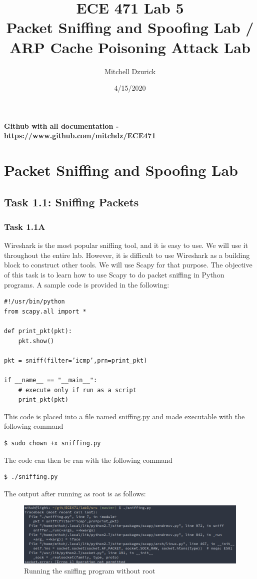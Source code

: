 \documentclass[12pt]{article}
\title {{\bf ECE 471 Lab 5} \\
\large{Packet Sniffing and Spoofing Lab / ARP Cache Poisoning Attack Lab
}}
\author{Mitchell Dzurick}
\date{4/15/2020}
\begin{document}
\maketitle
\textbf{Github with all documentation - \url{https://www.github.com/mitchdz/ECE471}}
\tableofcontents 
\clearpage



\section{Packet Sniffing and Spoofing Lab}

\subsection{Task 1.1: Sniffing Packets}
\subsubsection{Task 1.1A}
Wireshark is the most popular sniffing tool, and it is easy to use. We will use it throughout the entire lab.
However, it is difficult to use Wireshark as a building block to construct other tools. We will use Scapy
for that purpose. The objective of this task is to learn how to use Scapy to do packet sniffing in Python
programs. A sample code is provided in the following:
\begin{verbatim}
#!/usr/bin/python
from scapy.all import *

def print_pkt(pkt):
    pkt.show()

pkt = sniff(filter=’icmp’,prn=print_pkt)

if __name__ == "__main__":
    # execute only if run as a script
    print_pkt(pkt)

\end{verbatim}

This code is placed into a file named sniffing.py and made executable with the following command

\begin{verbatim}
$ sudo chown +x sniffing.py
\end{verbatim}
The code can then be ran with the following command
\begin{verbatim}
$ ./sniffing.py
\end{verbatim}

The output after running as root is as follows:
\begin{figure}[H]
\includegraphics[scale=0.45]{images/p1t1_1.png}
\caption{Running the sniffing program without root}
\label{fig:p1t1_1}
\end{figure}
\end{document}
